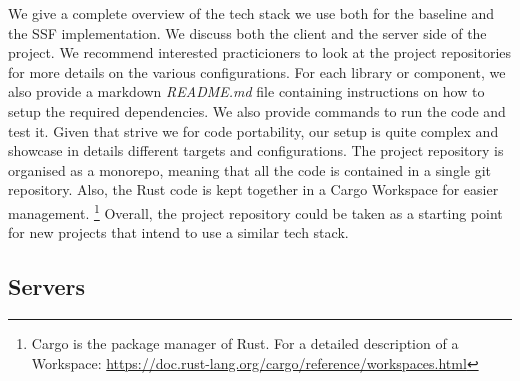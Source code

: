We give a complete overview of the tech stack we use both
for the baseline and the SSF implementation.
We discuss both the client and the server side of the project.
We recommend interested practicioners to look at the
project repositories for more details on the various
configurations.
For each library or component, we also provide a markdown
\textit{README.md} file containing instructions on how to
setup the required dependencies. We also provide commands
to run the code and test it.
Given that strive we for code portability, our setup
is quite complex and showcase in details
different targets and configurations.
The project repository is organised as a monorepo,
meaning that all the code is contained in a single
git repository. Also, the Rust code is kept
together in a Cargo Workspace for easier management.%
\footnote{Cargo is the package manager of Rust.
For a detailed description of a Workspace: \url{https://doc.rust-lang.org/cargo/reference/workspaces.html}}
Overall, the project repository
could be taken as a starting point for new projects that
intend to use a similar tech stack.

\subsection{Servers}\label{ssc:servers}

